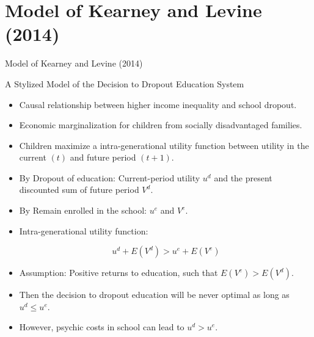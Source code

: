 \documentclass{beamer}
\begin{document}
\section{Model of Kearney and Levine (2014)}
\setcounter{equation}{0}
\begin{frame}[label=KearneyLevine]{Model of Kearney and Levine (2014)}
\begin{block}{A Stylized Model of the Decision to Dropout Education System}
\begin{itemize}
\item \footnotesize Causal relationship between higher income inequality and school dropout.
\item \footnotesize Economic marginalization for children from socially disadvantaged families.
\item \footnotesize Children maximize a intra-generational utility function between utility in the current $(t)$ and future period $(t+1)$.
\item \footnotesize By Dropout of education: Current-period utility $u^d$ and the present discounted sum of future period $V^d$.
\item \footnotesize By Remain enrolled in the school: $u^e$ and $V^e$.
\end{itemize}
\end{block}

\begin{itemize}
\item \footnotesize Intra-generational utility function:

\begin{equation} \label{eq:Condition1} 
u^d + E(V^d)>u^e + E(V^e)
\end{equation}


\item \footnotesize Assumption: Positive returns to education, such that $E(V^e)>E(V^d)$.

\item \footnotesize Then the decision to dropout education will be never optimal as long as $u^d \leq u^e$.

\item \footnotesize However, psychic costs in school can lead to $u^d > u^e$.
\end{itemize}
\end{frame}
\end{document}
